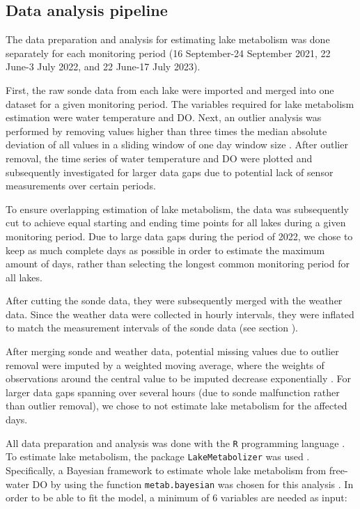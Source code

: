 \documentclass[11pt,lineno]{manuscript}\usepackage[]{graphicx}\usepackage[]{xcolor}
\begin{document}
\subsection{Data analysis pipeline} \label{subsec:pipeline}

The data preparation and analysis for estimating lake metabolism was done separately for each monitoring
period (16 September-24 September 2021, 22 June-3 July 2022, and 22 June-17 July 2023).

First, the raw sonde data from each lake were imported and merged into
one dataset for a given monitoring period. The variables required for lake metabolism
estimation were water temperature and
DO. Next, an outlier analysis was performed by removing
values higher than three times the median absolute deviation of all values in a
sliding window of one day window size \citep{Luerig:2021}.
After outlier removal, the time series of water temperature and DO
were plotted and subsequently investigated for larger data gaps due to potential lack of sensor
measurements over certain periods.

To ensure overlapping estimation of lake metabolism, the data was subsequently
cut to achieve equal starting and ending time points for all lakes during a given
monitoring period. Due to large data gaps during the period of 2022, we chose
to keep as much complete days as possible in order to estimate the maximum
amount of days, rather than selecting the longest common monitoring period
for all lakes.

After cutting the sonde data, they were subsequently merged with the weather data.
Since the weather data were collected in hourly intervals, they were inflated to match
the measurement intervals of the sonde data (see section ).

After merging sonde and weather data, potential missing values due to outlier removal
were imputed by a weighted moving average, where the weights of observations around the
central value to be imputed decrease exponentially \citep{Moritz:2017}.
For larger data gaps spanning over several hours (due to sonde malfunction rather
than outlier removal), we chose
to not estimate lake metabolism for the affected days.\smallskip

All data preparation and analysis was done with the \texttt{R} programming language \citep{R}.
To estimate lake metabolism, the package \texttt{LakeMetabolizer} was used \citep{Winslow:2016}.
Specifically, a Bayesian framework to estimate whole lake metabolism from free-water
DO by using the function \texttt{metab.bayesian} was chosen for
this analysis \citep{Holtgrieve:2010}.
In order to be able to fit the model, a minimum of 6 variables are needed as input:
\end{document}
